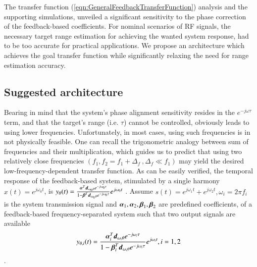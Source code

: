 The transfer function (\ref{eqn:GeneralFeedbackTransferFunction}) analysis and the supporting simulations, unveiled a significant sensitivity to the phase correction of the feedback-based coefficients. For nominal scenarios of RF signals, the necessary target range estimation for achieving the wanted system response, had to be too accurate for practical applications. We propose an architecture which achieves the goal transfer function while significantly relaxing the need for range estimation accuracy.
\subsection*{Suggested architecture}
Bearing in mind that the system's phase alignment sensitivity resides in the $e^{-j\omega\tau}$ term, and that the target's range (i.e. $\tau$) cannot be controlled, obviously leads to using lower frequencies. Unfortunately, in most cases, using such frequencies is in not physically feasible. One can recall the trigonometric analogy between sum of frequencies and their multiplication, which guides us to predict that using two relatively close frequencies $\left(f_{1},f_{2}=f_{1}+\Delta_{f} \ , \Delta_{f} \ll f_{1}\right)$ may yield the desired low-frequency-dependent transfer function. As can be easily verified, the temporal response of the feedback-based system, stimulated by a single harmony $x(t) = e^{j\omega_{0}t}$, is 
$
y_{\theta}(t)
=
\frac
{
\boldsymbol{\alpha}^{T}
\boldsymbol{d}_{\omega_{0}\theta}
e^{-j\omega_{0}\tau}
}
{
1
-
\boldsymbol{\beta}^{T}\boldsymbol{d}_{\omega_{0}\theta}
e^{-j\omega_{0}\tau}
}
e^{j\omega_{0}t}   
$
. Assume $s(t) = e^{j\omega_{1}t}+e^{j\omega_{2}t}, \omega_{i} = 2\pi{f_{i}}$ is the system transmission signal and $\boldsymbol{\alpha}_{1},\boldsymbol{\alpha}_{2},\boldsymbol{\beta}_{1},\boldsymbol{\beta}_{2}$ are predefined coefficients, of a feedback-based frequency-separated system such that two output signals are available
$$
y_{\theta,i}(t)
=
\frac
{
\boldsymbol{\alpha}_{i}^{T}
\boldsymbol{d}_{\omega_{i}\theta}
e^{-j\omega_{i}\tau}
}
{
1
-
\boldsymbol{\beta}_{i}^{T}\boldsymbol{d}_{\omega_{i}\theta}
e^{-j\omega_{i}\tau}
}
e^{j\omega_{i}t}
,
i=1,2
$$.
